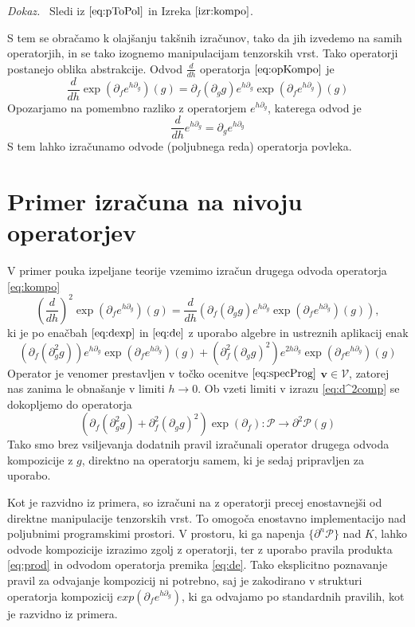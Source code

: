 \documentclass[a4paper, 12pt]{book}
\newcommand{\VV}{\mathcal{V}}
\newcommand{\vv}{\mathbf{v}}
\newcommand{\dP}{\mathcal{P}}
\newcommand{\D}{\partial}
\newenvironment{dokaz}{\emph{Dokaz.}\ }{\hspace{\fill}{$\Box$}}
\begin{document}
   \begin{dokaz}
   Sledi iz $\eqref{eq:pToPol}$ in Izreka $\ref{izr:kompo}$.
   \end{dokaz}

S tem se obračamo k olajšanju takšnih izračunov, tako da jih izvedemo na samih operatorjih, in se tako izognemo manipulacijam tenzorskih vrst. Tako operatorji postanejo oblika abstrakcije. Odvod $\frac{d}{dh}$ operatorja $\eqref{eq:opKompo}$ je
\begin{equation}\label{eq:dexp}
 \frac{d}{dh}\exp(\D_fe^{h\D_g})(g)=\D_f(\D_gg)e^{h\D_g}\exp(\D_fe^{h\D_g})(g)
 \end{equation}
Opozarjamo na pomembno razliko z operatorjem $e^{h\D_g}$, katerega odvod je
 \begin{equation}\label{eq:de}
\frac{d}{dh}e^{h\D_g}=\D_ge^{h\D_g}
 \end{equation}
 S tem lahko izračunamo odvode (poljubnega reda) operatorja povleka.
 
 \section{Primer izračuna na nivoju operatorjev}

V primer pouka izpeljane teorije vzemimo izračun drugega odvoda operatorja \eqref{eq:kompo}
$$\left(\frac{d}{dh}\right)^2\exp\left(\D_fe^{h\D_g}\right)(g)=\frac{d}{dh}\left(\D_f(\D_gg)e^{h\D_g}\exp\left(\D_fe^{h\D_g}\right)(g)\right),$$
ki je po enačbah $\eqref{eq:dexp}$ in $\eqref{eq:de}$ z uporabo algebre in ustreznih aplikacij enak
\begin{equation}\label{eq:d^2comp}
 \left(\D_f(\D^2_gg)\right)e^{h\D_g}\exp(\D_fe^{h\D_g})(g)+(\D^2_f(\D_gg)^2)e^{2h\D_g}\exp(\D_fe^{h\D_g})(g)
 \end{equation}
Operator je venomer prestavljen v točko ocenitve $\eqref{eq:specProg}$ $\vv\in\VV$, zatorej nas zanima le obnašanje v limiti $h\to 0$. Ob vzeti limiti v izrazu \eqref{eq:d^2comp} se dokopljemo do operatorja
 \begin{equation*}
	\left(\D_f(\D^2_gg)+\D^2_f(\D_gg)^2\right)\exp(\D_f):\dP\to\D^2\dP(g)
 \end{equation*}
Tako smo brez vsiljevanja dodatnih pravil izračunali operator drugega odvoda kompozicije z $g$, direktno na operatorju samem, ki je sedaj pripravljen za uporabo.

Kot je razvidno iz primera, so izračuni na z operatorji precej enostavnejši od direktne manipulacije tenzorskih vrst. To omogoča enostavno implementacijo nad poljubnimi programskimi prostori. V prostoru, ki ga napenja $\{\D^n\dP\}$ nad $K$, lahko odvode kompozicije izrazimo zgolj z operatorji, ter z uporabo pravila produkta \eqref{eq:prod} in odvodom operatorja premika \eqref{eq:de}. Tako eksplicitno poznavanje pravil za odvajanje kompozicij ni potrebno, saj je zakodirano v strukturi operatorja kompozicij $exp(\D_fe^{h\D_g})$, ki ga odvajamo po standardnih pravilih, kot je razvidno iz primera.
\end{document}
